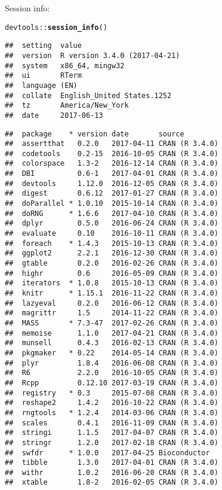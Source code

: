 \documentclass{article}\usepackage[]{graphicx}\usepackage[]{color}
\makeatletter
\newcommand{\hlopt}[1]{\textcolor[rgb]{0,0,0}{#1}}%
\newcommand{\hlstd}[1]{\textcolor[rgb]{0.345,0.345,0.345}{#1}}%
\newcommand{\hlkwd}[1]{\textcolor[rgb]{0.737,0.353,0.396}{\textbf{#1}}}%
\newenvironment{kframe}{%
 \def\at@end@of@kframe{}%
 \ifinner\ifhmode%
  \def\at@end@of@kframe{\end{minipage}}%
  \begin{minipage}{\columnwidth}%
 \fi\fi%
 \def\FrameCommand##1{\hskip\@totalleftmargin \hskip-\fboxsep
 \colorbox{shadecolor}{##1}\hskip-\fboxsep
     \hskip-\linewidth \hskip-\@totalleftmargin \hskip\columnwidth}%
 \MakeFramed {\advance\hsize-\width
   \@totalleftmargin\z@ \linewidth\hsize
   \@setminipage}}%
 {\par\unskip\endMakeFramed%
 \at@end@of@kframe}
\newenvironment{knitrout}{}{} %
\makeatother
\begin{document}
Session info:
\begin{knitrout}
\color{fgcolor}\begin{kframe}
\begin{alltt}
\hlstd{devtools}\hlopt{::}\hlkwd{session_info}\hlstd{()}
\end{alltt}


{\ttfamily\noindent\itshape\color{messagecolor}{\#\# Session info -----------------------------------------------}}\begin{verbatim}
##  setting  value                       
##  version  R version 3.4.0 (2017-04-21)
##  system   x86_64, mingw32             
##  ui       RTerm                       
##  language (EN)                        
##  collate  English_United States.1252  
##  tz       America/New_York            
##  date     2017-06-13
\end{verbatim}


{\ttfamily\noindent\itshape\color{messagecolor}{\#\# Packages ---------------------------------------------------}}\begin{verbatim}
##  package    * version date       source        
##  assertthat   0.2.0   2017-04-11 CRAN (R 3.4.0)
##  codetools    0.2-15  2016-10-05 CRAN (R 3.4.0)
##  colorspace   1.3-2   2016-12-14 CRAN (R 3.4.0)
##  DBI          0.6-1   2017-04-01 CRAN (R 3.4.0)
##  devtools     1.12.0  2016-12-05 CRAN (R 3.4.0)
##  digest       0.6.12  2017-01-27 CRAN (R 3.4.0)
##  doParallel * 1.0.10  2015-10-14 CRAN (R 3.4.0)
##  doRNG      * 1.6.6   2017-04-10 CRAN (R 3.4.0)
##  dplyr        0.5.0   2016-06-24 CRAN (R 3.4.0)
##  evaluate     0.10    2016-10-11 CRAN (R 3.4.0)
##  foreach    * 1.4.3   2015-10-13 CRAN (R 3.4.0)
##  ggplot2      2.2.1   2016-12-30 CRAN (R 3.4.0)
##  gtable       0.2.0   2016-02-26 CRAN (R 3.4.0)
##  highr        0.6     2016-05-09 CRAN (R 3.4.0)
##  iterators  * 1.0.8   2015-10-13 CRAN (R 3.4.0)
##  knitr      * 1.15.1  2016-11-22 CRAN (R 3.4.0)
##  lazyeval     0.2.0   2016-06-12 CRAN (R 3.4.0)
##  magrittr     1.5     2014-11-22 CRAN (R 3.4.0)
##  MASS       * 7.3-47  2017-02-26 CRAN (R 3.4.0)
##  memoise      1.1.0   2017-04-21 CRAN (R 3.4.0)
##  munsell      0.4.3   2016-02-13 CRAN (R 3.4.0)
##  pkgmaker   * 0.22    2014-05-14 CRAN (R 3.4.0)
##  plyr         1.8.4   2016-06-08 CRAN (R 3.4.0)
##  R6           2.2.0   2016-10-05 CRAN (R 3.4.0)
##  Rcpp         0.12.10 2017-03-19 CRAN (R 3.4.0)
##  registry   * 0.3     2015-07-08 CRAN (R 3.4.0)
##  reshape2     1.4.2   2016-10-22 CRAN (R 3.4.0)
##  rngtools   * 1.2.4   2014-03-06 CRAN (R 3.4.0)
##  scales       0.4.1   2016-11-09 CRAN (R 3.4.0)
##  stringi      1.1.5   2017-04-07 CRAN (R 3.4.0)
##  stringr      1.2.0   2017-02-18 CRAN (R 3.4.0)
##  swfdr      * 1.0.0   2017-04-25 Bioconductor  
##  tibble       1.3.0   2017-04-01 CRAN (R 3.4.0)
##  withr        1.0.2   2016-06-20 CRAN (R 3.4.0)
##  xtable       1.8-2   2016-02-05 CRAN (R 3.4.0)
\end{verbatim}
\end{kframe}
\end{knitrout}
\end{document}

